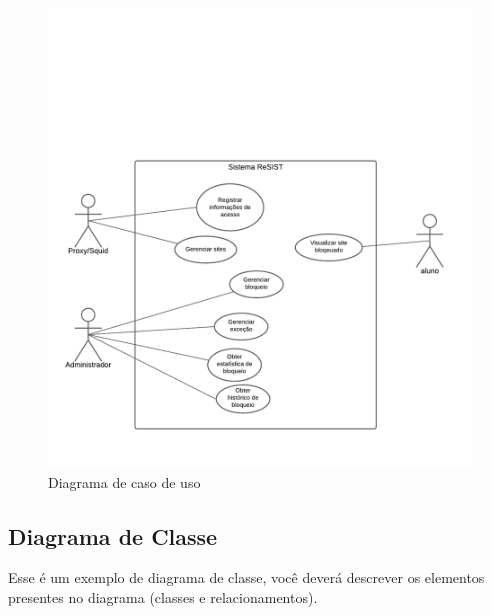 \documentclass[
  a4paper,%
  12pt,%
  english,%
  brazilian,%
]{article}
\begin{document}
\begin{figure}[H]
    \centering
    \caption{Diagrama de caso de uso}
    \label{fig:diagrama-caso-uso}
    \includegraphics[width=\textwidth]{Logos/UML-Casos-de-uso.pdf}
\end{figure}

    
    
    \subsection*{Diagrama de Classe}

    Esse é um exemplo de diagrama de classe, você deverá descrever os elementos presentes no diagrama (classes e relacionamentos).
\end{document}
